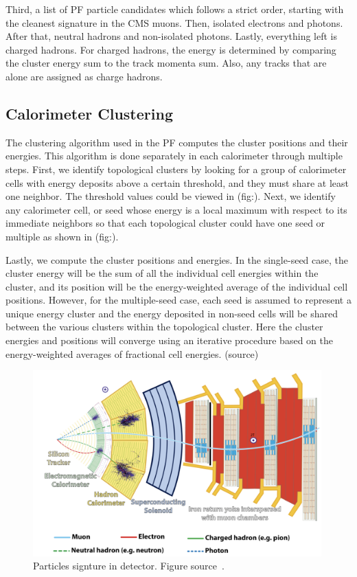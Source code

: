 Third, a list of PF particle candidates which follows a strict order, starting with the cleanest signature in the CMS muons.
Then, isolated electrons and photons.
After that, neutral hadrons and non-isolated photons.
Lastly, everything left is charged hadrons.
For charged hadrons, the energy is determined by comparing the cluster energy sum to the track momenta sum.
Also, any tracks that are alone are assigned as charge hadrons.

\subsection{Calorimeter Clustering}
The clustering algorithm used in the PF computes the cluster positions and their energies.
This algorithm is done separately in each calorimeter through multiple steps.
First, we identify topological clusters by looking for a group of calorimeter cells with energy deposits above a certain threshold, and they must share at least one neighbor.
The threshold values could be viewed in (fig:).
Next, we identify any calorimeter cell, or seed whose energy is a local maximum with respect to its immediate neighbors so that each topological cluster could have one seed or multiple as shown in (fig:).

Lastly, we compute the cluster positions and energies.
In the single-seed case, the cluster energy will be the sum of all the individual cell energies within the cluster, and its position will be the energy-weighted average of the individual cell positions.
However, for the multiple-seed case, each seed is assumed to represent a unique energy cluster and the energy deposited in non-seed cells will be shared between the various clusters within the topological cluster.
Here the cluster energies and positions will converge using an iterative procedure based on the energy-weighted averages of fractional cell energies. (source)

\begin{figure}[t!]
\centering
\includegraphics[width=0.99\textwidth]{figures/particles_signture_in_detector.png}
\caption[Particles signture in detector]{Particles signture in detector. Figure source~\cite{}.}
\label{fig:Particles_in_CMS}
\end{figure}

